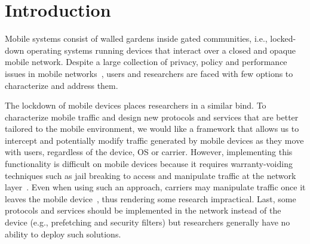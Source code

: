 \section{Introduction}
\label{sec:introduction}

Mobile systems consist of walled gardens inside gated 
communities, i.e., locked-down operating systems running 
devices that interact over a closed and opaque mobile network. 
Despite a large collection of privacy, policy and performance issues
in mobile networks~\cite{enck:taintdroid,hornyack:appfence,speedtest,eprof},
users and researchers are faced with few options to  
characterize and address them.


The lockdown of mobile devices places researchers in a similar bind.
To characterize mobile traffic and design new protocols and
services that are better tailored to the mobile environment, we would like a
framework that allows us to intercept and potentially modify traffic
generated by mobile devices as they move with users, regardless of the
device, OS or carrier. However, implementing this functionality is
difficult on mobile devices because it requires warranty-voiding
techniques such as jail breaking to access and manipulate traffic at
the network layer~\cite{enck:taintdroid}. Even when using such an
approach, carriers may manipulate traffic once it leaves the mobile
device~\cite{wang:middleboxes}, thus rendering some research
impractical. Last, some protocols and services should be implemented
in the network instead of the device (e.g., prefetching and security
filters) but researchers generally have no ability to deploy such
solutions.

